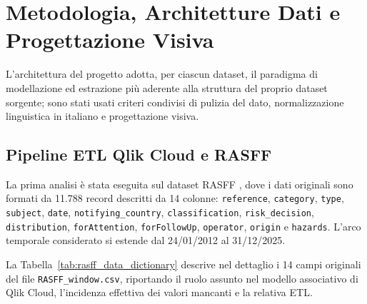 \chapter{Metodologia, Architetture Dati e Progettazione Visiva}
\label{chap:methodology}

L'architettura del progetto adotta, per ciascun dataset, il paradigma di modellazione ed estrazione più aderente alla struttura del proprio dataset sorgente; sono stati usati criteri condivisi di pulizia del dato, normalizzazione linguistica in italiano e progettazione visiva.

\section{Pipeline ETL Qlik Cloud e RASFF}
\label{sec:method_qlik}

La prima analisi è stata eseguita sul dataset RASFF \citep{rasff_portal}, dove i dati originali sono formati da 11.788 record descritti da 14 colonne: \texttt{reference}, \texttt{category}, \texttt{type}, \texttt{subject}, \texttt{date}, \texttt{notifying\_country}, \texttt{classification}, \texttt{risk\_decision}, \texttt{distribution}, \texttt{forAttention}, \texttt{forFollowUp}, \texttt{operator}, \texttt{origin} e \texttt{hazards}. L'arco temporale considerato si estende dal 24/01/2012 al 31/12/2025.

\noindent
La Tabella~\ref{tab:rasff_data_dictionary} descrive nel dettaglio i 14 campi originali del file \texttt{RASFF\_window.csv}, riportando il ruolo assunto nel modello associativo di Qlik Cloud, l'incidenza effettiva dei valori mancanti e la relativa ETL.


